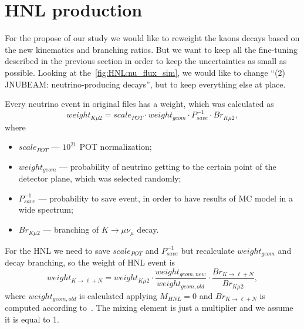 \documentclass[../main.tex]{subfiles}
\begin{document}
\section{HNL production}

For the propose of our study we would like to reweight the kaons decays based on the new kinematics and branching ratios. But we want to keep all the fine-tuning described in the previous section in order to keep the uncertainties as small as possible. Looking at the~\autoref{fig:HNL:nu_flux_sim}, we would like to change ``(2) JNUBEAM: neutrino-producing decays'', but to keep everything else at place.

Every neutrino event in original files has a weight, which was calculated as
\begin{equation}
    weight_{K\mu2}=scale_{POT}\cdot weight_{geom}\cdot P_{save}^{-1}\cdot Br_{K\mu2},
\end{equation}
where
\begin{itemize}
    \item $scale_{POT}$ --- $10^{21}$ POT normalization;
    \item $weight_{geom}$ --- probability of neutrino getting to the certain point of the detector plane, which was selected randomly;
    \item$P_{save}^{-1}$ --- probability to save event, in order to have results of MC model in a wide spectrum;
    \item $Br_{K\mu2}$ --- branching of $K\rightarrow\mu\nu_{\mu}$ decay.
\end{itemize}

For the HNL we need to save $scale_{POT}$ and $P_{save}^{-1}$ but recalculate $weight_{geom}$ and decay branching, so the weight of HNL event is
\begin{equation}
    weight_{K\rightarrow \ell+N}=weight_{K\mu2}\cdot\frac{weight_{geom,new}}{weight_{geom,old}}\cdot \frac{Br_{K\rightarrow \ell+N}}{Br_{K\mu2}},
    \label{eq:HNL:weightDif}
\end{equation}
where $weight_{geom,old}$ is calculated applying $M_{HNL}=0$ and $Br_{K\rightarrow \ell+N}$ is computed according to~\cite{Gorbunov2007}. The mixing element is just a multiplier and we assume it is equal to 1.
\end{document}
